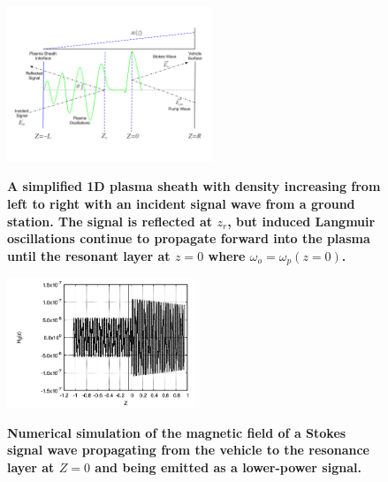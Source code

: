 \documentclass[twocolumn]{article}
\begin{document}
			\begin{figure}[t]
				\centering
				\includegraphics[width = 0.55\textwidth]{Images/StokesDiagram.png}
				\label{subfig:Stokes2}
				\caption{\textbf{A simplified 1D plasma sheath with density increasing from left to right with an incident signal wave from a ground station. The signal is reflected at $z_r$, but induced Langmuir oscillations continue to propagate forward into the plasma until the resonant layer at $z=0$ where $\omega_o = \omega_p(z=0)$.}}
				\label{fig:StokesDiagram}
			\end{figure}
			
			\begin{figure}[t]
				\centering
					\includegraphics[width = 0.5\textwidth]{Images/Stokes_NumericalSim2.png}
					\label{subfig:Stokes2}
				\caption{\textbf{Numerical simulation of the magnetic field of a Stokes signal wave propagating from the vehicle to the resonance layer at $Z=0$ and being emitted as a lower-power signal.}}
				\label{fig:StokesNumericalSim}
			\end{figure}
\end{document}
